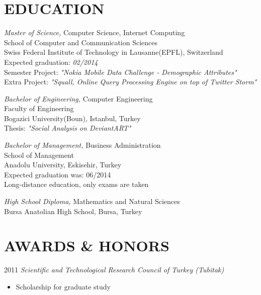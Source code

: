 \documentclass[line, margin]{res}
\begin{document}
\address{Avenue de Rhodanie 64 Chambre 524, 1007 Lausanne Switzerland, (+41) 78 926 9917}
\address{\textit{ferhat.elmas@epfl.ch \hspace{6.2cm} github.com/ferhatelmas}}
 
\begin{resume}
  
\section{EDUCATION}
				{\sl Master of Science,} Computer Science, Internet Computing\\
				School of Computer and Communication Sciences \\
				Swiss Federal Institute of Technology in Lausanne(EPFL), Switzerland \\
                Expected graduation: \textit{02/2014} \\
                Semester Project: \textit{"Nokia Mobile Data Challenge - Demographic Attributes"} \\
                Extra Project: \textit{"Squall, Online Query Processing Engine on top of Twitter Storm"}
 
				{\sl Bachelor of Engineering,} Computer Engineering \\
				Faculty of Engineering \\
				Bogazici University(Boun), Istanbul, Turkey \\                
                Thesis: \textit{"Social Analysis on DeviantART"}
 
				{\sl Bachelor of Management,}  Business Administration \\
				School of Management \\
				Anadolu University, Eskisehir, Turkey \\          
				Expected graduation was: 06/2014 \\        
                Long-distance education, only exams are taken

				{\sl High School Diploma,} Mathematics and Natural Sciences \\
				Bursa Anatolian High School, Bursa, Turkey \\               

\section{AWARDS \& HONORS}
				2011 {\sl Scientific and Technological Research Council of Turkey (Tubitak)} \\
				\vspace{-.3cm}				
				\begin{itemize}
					\item Scholarship for graduate study
				\end{itemize}
				

\end{resume}
\end{document}
